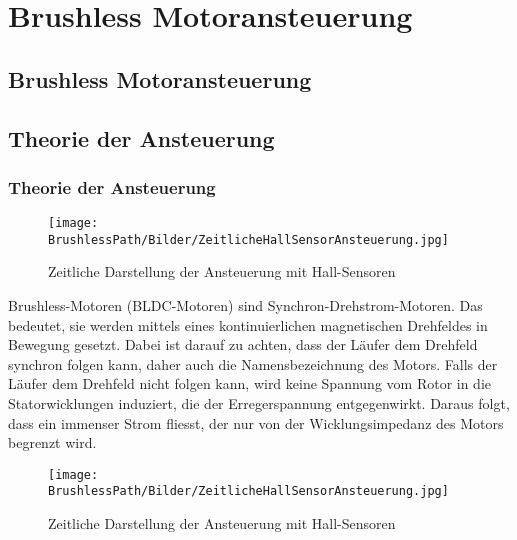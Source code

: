 ﻿\ifSTANDALONE
\section{Brushless Motoransteuerung}
\fi
\ifEMBED
\subsection{Brushless Motoransteuerung}
\fi

\ifEMBED
    \BLDCcollab
\fi
    \ifSTANDALONE
    \subsection{Theorie der Ansteuerung}
    \fi
    \ifEMBED
    \subsubsection{Theorie der Ansteuerung}
    \fi
    \ifEMBED
        \begin{wrapfigure}{r}{0.50\textwidth}
           	\texttt{[image: \\BrushlessPath/Bilder/ZeitlicheHallSensorAnsteuerung.jpg]}
           	\caption[Zeitliche Darstellung der Ansteuerung mit 
                Hall-Sensoren]{Zeitliche Darstellung der Ansteuerung mit 
                Hall-Sensoren \cite{AppNote:BrushlessuC}}
           	\centering
            \label{abb:ZeitlicheAnsteuerungBrushlessMotor}
        \end{wrapfigure}
    \fi
        Brushless-Motoren (BLDC-Motoren) sind Synchron-Drehstrom-Motoren. Das bedeutet, sie 
        werden mittels eines kontinuierlichen magnetischen Drehfeldes in Bewegung gesetzt. 
        Dabei ist darauf zu achten, dass der Läufer dem Drehfeld synchron 
        folgen kann, daher auch die Namensbezeichnung des Motors. Falls der Läufer dem Drehfeld nicht folgen kann, wird keine Spannung 	vom Rotor in die         Statorwicklungen induziert, die der Erregerspannung entgegenwirkt. 
        Daraus folgt, dass ein immenser Strom fliesst, der nur von der 
        Wicklungsimpedanz des Motors begrenzt wird.\\
        \ifSTANDALONE
           \begin{figure}[h!]
               \centering
               \texttt{[image: \\BrushlessPath/Bilder/ZeitlicheHallSensorAnsteuerung.jpg]}
               \caption[Zeitliche Darstellung der Ansteuerung mit 
                   Hall-Sensoren]{Zeitliche Darstellung der Ansteuerung mit 
                   Hall-Sensoren \cite{AppNote:BrushlessuC}}
              	\centering
               \label{abb:ZeitlicheAnsteuerungBrushlessMotor}
           \end{figure}
